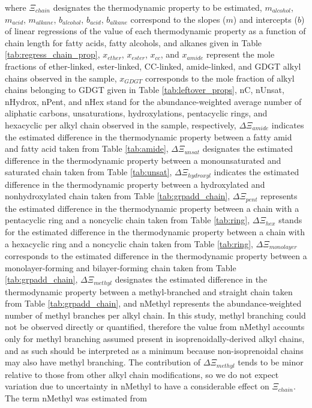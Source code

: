 \noindent where $\Xi_{chain}$ designates the thermodynamic property to be estimated, $m_{alcohol}$, $m_{acid}$, $m_{alkane}$, $b_{alcohol}$, $b_{acid}$, $b_{alkane}$ correspond to the slopes ($m$) and intercepts ($b$) of linear regressions of the value of each thermodynamic property as a function of chain length for fatty acids, fatty alcohols, and alkanes given in Table \ref{tab:regress_chain_prop}, $x_{ether}$, $x_{ester}$, $x_{cc}$, and $x_{amide}$ represent the mole fractions of ether-linked, ester-linked, CC-linked, amide-linked, and GDGT alkyl chains observed in the sample, $x_{GDGT}$ corresponds to the mole fraction of alkyl chains belonging to GDGT given in Table \ref{tab:leftover_props},  nC, nUnsat, nHydrox, nPent, and nHex stand for the abundance-weighted average number of aliphatic carbons, unsaturations, hydroxylations, pentacyclic rings, and hexacyclic per alkyl chain observed in the sample, respectively, $\Delta\Xi_{amide}$ indicates the estimated difference in the thermodynamic property between a fatty amid and fatty acid taken from Table \ref{tab:amide}, $\Delta\Xi_{unsat}$ designates the estimated difference in the thermodynamic property between a monounsaturated and saturated chain taken from Table \ref{tab:unsat}, $\Delta\Xi_{hydroxyl}$ indicates the estimated difference in the thermodynamic property between a hydroxylated and nonhydroxylated chain taken from Table \ref{tab:grpadd_chain}, $\Delta\Xi_{pent}$ represents the estimated difference in the thermodynamic property between a chain with a pentacyclic ring and a noncyclic chain taken from Table \ref{tab:ring}, $\Delta\Xi_{hex}$ stands for the estimated difference in the thermodynamic property between a chain with a hexacyclic ring and a noncyclic chain taken from Table \ref{tab:ring}, $\Delta\Xi_{monolayer}$ corresponds to the estimated difference in the thermodynamic property between a monolayer-forming and bilayer-forming chain taken from Table \ref{tab:grpadd_chain}, $\Delta\Xi_{methyl}$ designates the estimated difference in the thermodynamic property between a methyl-branched and straight chain taken from Table \ref{tab:grpadd_chain}, and nMethyl represents the abundance-weighted number of methyl branches per alkyl chain. In this study, methyl branching could not be observed directly or quantified, therefore the value from nMethyl accounts only for methyl branching assumed present in isoprenoidally-derived alkyl chains, and as such should be interpreted as a minimum because non-isoprenoidal chains may also have methyl branching. The contribution of $\Delta\Xi_{methyl}$ tends to be minor relative to those from other alkyl chain modifications, so we do not expect variation due to uncertainty in nMethyl to have a considerable effect on $\Xi_{chain}$. The term nMethyl was estimated from

